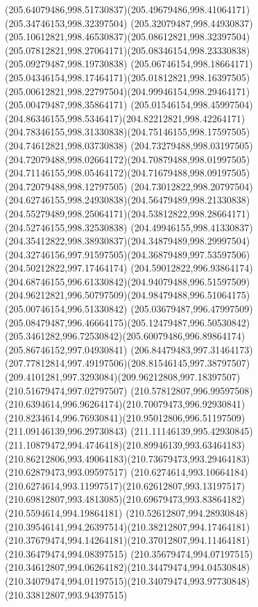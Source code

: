 {{		\curveto(205.64079486,998.51730837)(205.49679486,998.41064171)(205.34746153,998.32397504)
		\curveto(205.32079487,998.44930837)(205.10612821,998.46530837)(205.08612821,998.32397504)
		\curveto(205.07812821,998.27064171)(205.08346154,998.23330838)(205.09279487,998.19730838)
		\curveto(205.06746154,998.18664171)(205.04346154,998.17464171)(205.01812821,998.16397505)
		\curveto(205.00612821,998.22797504)(204.99946154,998.29464171)(205.00479487,998.35864171)
		\curveto(205.01546154,998.45997504)(204.86346155,998.5346417)(204.82212821,998.42264171)
		\curveto(204.78346155,998.31330838)(204.75146155,998.17597505)(204.74612821,998.03730838)
		\curveto(204.73279488,998.03197505)(204.72079488,998.02664172)(204.70879488,998.01997505)
		\curveto(204.71146155,998.05464172)(204.71679488,998.09197505)(204.72079488,998.12797505)
		\curveto(204.73012822,998.20797504)(204.62746155,998.24930838)(204.56479489,998.21330838)
		\curveto(204.55279489,998.25064171)(204.53812822,998.28664171)(204.52746155,998.32530838)
		\curveto(204.49946155,998.41330837)(204.35412822,998.38930837)(204.34879489,998.29997504)
		\curveto(204.32746156,997.91597505)(204.36879489,997.53597506)(204.50212822,997.17464174)
		\curveto(204.59012822,996.93864174)(204.68746155,996.61330842)(204.94079488,996.51597509)
		\curveto(204.96212821,996.50797509)(204.98479488,996.51064175)(205.00746154,996.51330842)
		\curveto(205.03679487,996.47997509)(205.08479487,996.46664175)(205.12479487,996.50530842)
		\curveto(205.3461282,996.72530842)(205.60079486,996.89864174)(205.86746152,997.04930841)
		\curveto(206.84479483,997.31464173)(207.77812814,997.49197506)(208.81546145,997.38797507)
		\curveto(209.4101281,997.3293084)(209.96212808,997.18397507)(210.51679474,997.02797507)
		\curveto(210.57812807,996.99597508)(210.6394614,996.96264174)(210.70079473,996.92930841)
		\curveto(210.8234614,996.76930841)(210.95012806,996.51197509)(211.09146139,996.29730843)
		\curveto(211.11146139,995.42930845)(211.10879472,994.4746418)(210.89946139,993.63464183)
		\curveto(210.86212806,993.49064183)(210.73679473,993.29464183)(210.62879473,993.09597517)
		\curveto(210.6274614,993.10664184)(210.6274614,993.11997517)(210.62612807,993.13197517)
		\curveto(210.69812807,993.4813085)(210.69679473,993.83864182)(210.5594614,994.19864181)
		\curveto(210.52612807,994.28930848)(210.39546141,994.26397514)(210.38212807,994.17464181)
		\curveto(210.37679474,994.14264181)(210.37012807,994.11464181)(210.36479474,994.08397515)
		\curveto(210.35679474,994.07197515)(210.34612807,994.06264182)(210.34479474,994.04530848)
		\curveto(210.34079474,994.01197515)(210.34079474,993.97730848)(210.33812807,993.94397515)
}}
